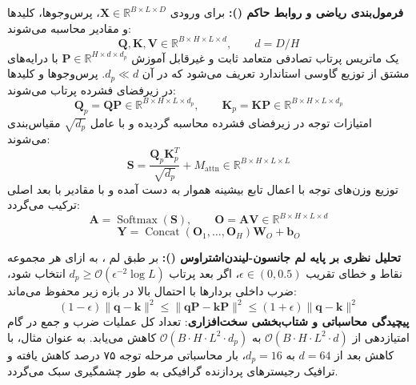 \textbf{فرمول‌بندی ریاضی و روابط حاکم ():}
برای ورودی $\mathbf{X} \in \mathbb{R}^{B \times L \times D}$، پرس‌وجوها، کلیدها و مقادیر محاسبه می‌شوند:
\begin{equation}
\mathbf{Q}, \mathbf{K}, \mathbf{V} \in \mathbb{R}^{B \times H \times L \times d}, \qquad d = D / H
\end{equation}
یک ماتریس پرتاب تصادفی متعامد ثابت و غیرقابل آموزش $\mathbf{P} \in \mathbb{R}^{H \times d \times d_p}$ با درایه‌های مشتق از توزیع گاوسی استاندارد تعریف می‌شود که در آن $d_p \ll d$. پرس‌وجوها و کلیدها در زیرفضای فشرده پرتاب می‌شوند:
\begin{equation}
\mathbf{Q}_p = \mathbf{Q} \mathbf{P} \in \mathbb{R}^{B \times H \times L \times d_p}, \qquad
\mathbf{K}_p = \mathbf{K} \mathbf{P} \in \mathbb{R}^{B \times H \times L \times d_p}
\end{equation}
امتیازات توجه در زیرفضای فشرده محاسبه گردیده و با عامل $\sqrt{d_p}$ مقیاس‌بندی می‌شوند:
\begin{equation}
\mathbf{S} = \frac{\mathbf{Q}_p \mathbf{K}_p^T}{\sqrt{d_p}} + M_{\text{attn}} \in \mathbb{R}^{B \times H \times L \times L}
\end{equation}
توزیع وزن‌های توجه با اعمال تابع بیشینه هموار به دست آمده و با مقادیر با بعد اصلی ترکیب می‌گردد:
\begin{equation}
\mathbf{A} = \operatorname{Softmax}(\mathbf{S}), \qquad \mathbf{O} = \mathbf{A} \mathbf{V} \in \mathbb{R}^{B \times H \times L \times d}
\end{equation}
\begin{equation}
\mathbf{Y} = \operatorname{Concat}(\mathbf{O}_1, \dots, \mathbf{O}_H) \mathbf{W}_O + \mathbf{b}_O
\end{equation}

\textbf{تحلیل نظری بر پایه لم جانسون-لیندن‌اشتراوس ():}
بر طبق لم ، به ازای هر مجموعه نقاط و خطای تقریب $\epsilon \in (0, 0.5)$، اگر بعد پرتاب $d_p \ge \mathcal{O}(\epsilon^{-2} \log L)$ انتخاب شود، ضرب داخلی بردارها با احتمال بالا در بازه زیر محفوظ می‌ماند:
\begin{equation}
(1 - \epsilon) \|\mathbf{q} - \mathbf{k}\|^2 \le \|\mathbf{q}\mathbf{P} - \mathbf{k}\mathbf{P}\|^2 \le (1 + \epsilon) \|\mathbf{q} - \mathbf{k}\|^2
\end{equation}
\textbf{پیچیدگی محاسباتی و شتاب‌بخشی سخت‌افزاری}: تعداد کل عملیات ضرب و جمع در گام امتیازدهی از $\mathcal{O}(B \cdot H \cdot L^2 \cdot d)$ به $\mathcal{O}(B \cdot H \cdot L^2 \cdot d_p)$ کاهش می‌یابد. به عنوان مثال، با کاهش بعد از $d = 64$ به $d_p = 16$، بار محاسباتی مرحله توجه ۷۵ درصد کاهش یافته و ترافیک رجیسترهای پردازنده گرافیکی به طور چشمگیری سبک می‌گردد.



